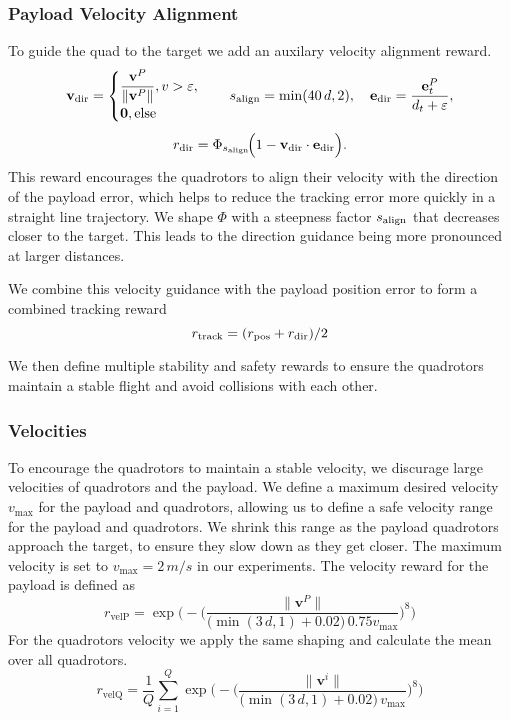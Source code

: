 \subsubsection{Payload Velocity Alignment}
To guide the quad to the target we add an auxilary velocity alignment reward.
\begin{equation}
\mathbf{v}_{\rm dir} =
\begin{cases}
\dfrac{\mathbf{v}^P}{\lVert \mathbf{v}^P\rVert},  v > \varepsilon,\\[4pt]
\mathbf{0},  \text{else}
\end{cases}
\quad
s_{\rm align} = \min(40\,d,2), \quad
\mathbf{e}_{\rm dir} = \dfrac{\mathbf{e}^P_t}{d_t + \varepsilon},
\end{equation}
\begin{equation}
r_{\rm dir} = \Phi_{s_{\rm align}}\!\Bigl(1 - \mathbf{v}_{\rm dir}\cdot\mathbf{e}_{\rm dir}\Bigr).
\end{equation}
This reward encourages the quadrotors to align their velocity with the direction of the payload error, which helps to reduce the tracking error more quickly in a straight line trajectory. We shape $\Phi$ with a steepness factor $s_{\rm align}$ that decreases closer to the target. This leads to the direction guidance being more pronounced at larger distances.

We combine this velocity guidance with the payload position error to form a combined tracking reward
\begin{equation}
r_{\mathrm{track}} =(r_{\mathrm{pos}} + r_{\rm dir})/2
\end{equation}

We then define multiple stability and safety rewards to ensure the quadrotors maintain a stable flight and avoid collisions with each other.

\subsubsection{Velocities}
To encourage the quadrotors to maintain a stable velocity, we discurage large velocities of quadrotors and the payload. We define a maximum desired velocity $v_{\max}$ for the payload and quadrotors, allowing us to define a safe velocity range for the payload and quadrotors. We shrink this range as the payload quadrotors approach the target, to ensure they slow down as they get closer. The maximum velocity is set to $v_{\max}=2\,m/s$ in our experiments. The velocity reward for the payload is defined as
\begin{equation}
r_{\mathrm{velP}}
= \exp\!\Biggl(-\biggl(\frac{\lVert \mathbf{v}^P\rVert}{\bigl(\min(3\,d,1)+0.02\bigr)\,0.75v_{\max}}\biggr)^{8}\Biggr)
\end{equation}
For the quadrotors velocity we apply the same shaping and calculate the mean over all quadrotors.
\begin{equation}
r_{\mathrm{velQ}}
= \frac{1}{Q}\sum_{i=1}^Q \exp\!\Biggl(-\biggl(\frac{\lVert \mathbf{v}^i\rVert}{\bigl(\min(3\,d,1)+0.02\bigr)\,v_{\max}}\biggr)^{8}\Biggr) 
\end{equation}
